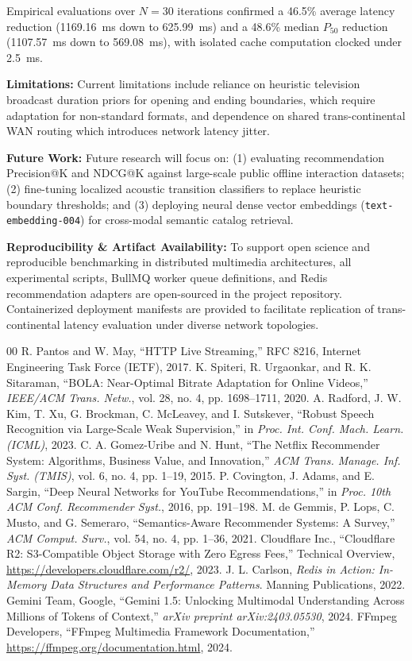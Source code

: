 \documentclass[conference]{IEEEtran}
\begin{document}
Empirical evaluations over $N = 30$ iterations confirmed a 46.5\% average latency reduction (1169.16~ms down to 625.99~ms) and a 48.6\% median $P_{50}$ reduction (1107.57~ms down to 569.08~ms), with isolated cache computation clocked under 2.5~ms. 

\textbf{Limitations:} Current limitations include reliance on heuristic television broadcast duration priors for opening and ending boundaries, which require adaptation for non-standard formats, and dependence on shared trans-continental WAN routing which introduces network latency jitter. 

\textbf{Future Work:} Future research will focus on: (1) evaluating recommendation Precision@K and NDCG@K against large-scale public offline interaction datasets; (2) fine-tuning localized acoustic transition classifiers to replace heuristic boundary thresholds; and (3) deploying neural dense vector embeddings (\texttt{text-embedding-004}) for cross-modal semantic catalog retrieval.

\textbf{Reproducibility \& Artifact Availability:} To support open science and reproducible benchmarking in distributed multimedia architectures, all experimental scripts, BullMQ worker queue definitions, and Redis recommendation adapters are open-sourced in the project repository. Containerized deployment manifests are provided to facilitate replication of trans-continental latency evaluation under diverse network topologies.

\clearpage
{}
\begin{thebibliography}{00}
 R. Pantos and W. May, ``HTTP Live Streaming,'' RFC 8216, Internet Engineering Task Force (IETF), 2017.
 K. Spiteri, R. Urgaonkar, and R. K. Sitaraman, ``BOLA: Near-Optimal Bitrate Adaptation for Online Videos,'' \textit{IEEE/ACM Trans. Netw.}, vol. 28, no. 4, pp. 1698--1711, 2020.
 A. Radford, J. W. Kim, T. Xu, G. Brockman, C. McLeavey, and I. Sutskever, ``Robust Speech Recognition via Large-Scale Weak Supervision,'' in \textit{Proc. Int. Conf. Mach. Learn. (ICML)}, 2023.
 C. A. Gomez-Uribe and N. Hunt, ``The Netflix Recommender System: Algorithms, Business Value, and Innovation,'' \textit{ACM Trans. Manage. Inf. Syst. (TMIS)}, vol. 6, no. 4, pp. 1--19, 2015.
 P. Covington, J. Adams, and E. Sargin, ``Deep Neural Networks for YouTube Recommendations,'' in \textit{Proc. 10th ACM Conf. Recommender Syst.}, 2016, pp. 191--198.
 M. de Gemmis, P. Lops, C. Musto, and G. Semeraro, ``Semantics-Aware Recommender Systems: A Survey,'' \textit{ACM Comput. Surv.}, vol. 54, no. 4, pp. 1--36, 2021.
 Cloudflare Inc., ``Cloudflare R2: S3-Compatible Object Storage with Zero Egress Fees,'' Technical Overview, \url{https://developers.cloudflare.com/r2/}, 2023.
 J. L. Carlson, \textit{Redis in Action: In-Memory Data Structures and Performance Patterns}. Manning Publications, 2022.
 Gemini Team, Google, ``Gemini 1.5: Unlocking Multimodal Understanding Across Millions of Tokens of Context,'' \textit{arXiv preprint arXiv:2403.05530}, 2024.
 FFmpeg Developers, ``FFmpeg Multimedia Framework Documentation,'' \url{https://ffmpeg.org/documentation.html}, 2024.
\end{thebibliography}
\end{document}
